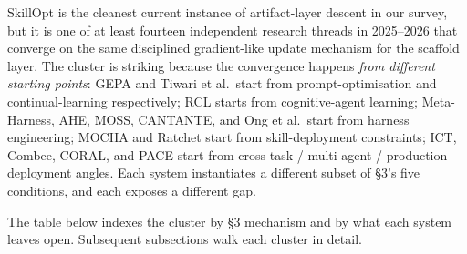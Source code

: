 SkillOpt \citep{yang2026skillopt} is the cleanest current instance of
artifact-layer descent in our survey, but it is one of at least fourteen
independent research threads in 2025--2026 that converge on the same
disciplined gradient-like update mechanism for the scaffold layer. The
cluster is striking because the convergence happens \emph{from different
starting points}: GEPA and Tiwari et al.~start from prompt-optimisation
and continual-learning respectively; RCL starts from cognitive-agent
learning; Meta-Harness, AHE, MOSS, CANTANTE, and Ong et al.~start from
harness engineering; MOCHA and Ratchet start from skill-deployment
constraints; ICT, Combee, CORAL, and PACE start from cross-task /
multi-agent / production-deployment angles. Each system instantiates a
different subset of §3's five conditions, and each exposes a different
gap.

The table below indexes the cluster by §3 mechanism and by what each
system leaves open. Subsequent subsections walk each cluster in detail.

